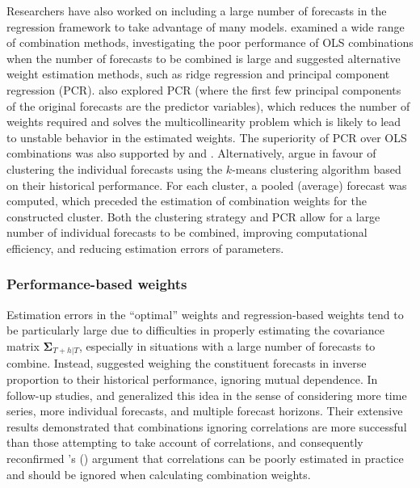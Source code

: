 \documentclass[11pt]{article}
\def\citeapos#1{\citeauthor{#1}'s (\citeyear{#1})}
\begin{document}
Researchers have also worked on including a large number of forecasts in the regression framework to take advantage of many models. \citet{Chan1999-io} examined a wide range of combination methods, investigating the poor performance of OLS combinations when the number of forecasts to be combined is large and suggested alternative weight estimation methods, such as ridge regression and principal component regression (PCR). \citet{Stock2004-rq} also explored PCR (where the first few principal components of the original forecasts are the predictor variables), which reduces the number of weights required and solves the multicollinearity problem which is likely to lead to unstable behavior in the estimated weights. The superiority of PCR over OLS combinations was also supported by \citet{Rapach2008-jh} and \citet{Poncela2011-vz}. Alternatively, \citet{Aiolfi2006-rh} argue in favour of clustering the individual forecasts using the $k$-means clustering algorithm based on their historical performance. For each cluster, a pooled (average) forecast was computed, which preceded the estimation of combination weights for the constructed cluster. Both the clustering strategy and PCR allow for a large number of individual forecasts to be combined, improving computational efficiency, and reducing estimation errors of parameters.

\subsubsection*{Performance-based weights}

Estimation errors in the ``optimal'' weights and regression-based weights tend to be particularly large due to difficulties in properly estimating the covariance matrix $\bm{\Sigma}_{T+h|T}$, especially in situations with a large number of forecasts to combine. Instead, \citet{Bates1969-yj} suggested weighing the constituent forecasts in inverse proportion to their historical performance, ignoring mutual dependence. In follow-up studies, \citet{Newbold1974-lp} and \citet{Winkler1983-ra} generalized this idea in the sense of considering more time series, more individual forecasts, and multiple forecast horizons. Their extensive results demonstrated that combinations ignoring correlations are more successful than those attempting to take account of correlations, and consequently reconfirmed \citeapos{Bates1969-yj} argument that correlations can be poorly estimated in practice and should be ignored when calculating combination weights.
\end{document}
